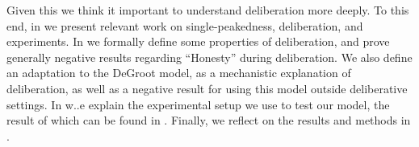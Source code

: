 Given this we think it important to understand deliberation more deeply. To
this end, in  we present relevant work on single-peakedness,
deliberation, and experiments. In  we formally define some
properties of deliberation, and prove generally negative results regarding
``Honesty'' during deliberation. We also define an adaptation to the DeGroot
model, as a mechanistic explanation of deliberation, as well as a negative
result for using this model outside deliberative settings. In 
w..e explain the experimental setup we use to test our model, the result of
which can be found in . Finally, we reflect on the
results and methods in .






